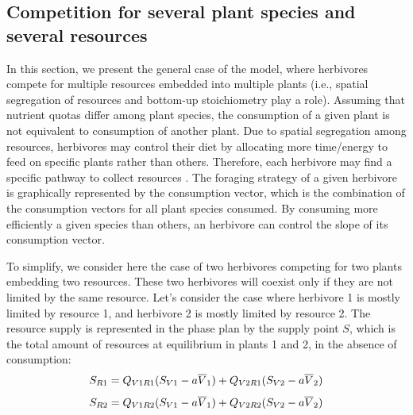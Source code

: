 \documentclass[12pt]{article}
\newcommand\barre[1]{\overline{\rule{0pt}{1.5ex}#1}}
\begin{document}



\subsection*{Competition for several plant species and several resources}

In this section, we present the general case of the model, where herbivores compete for multiple resources embedded into multiple plants (i.e., spatial segregation of resources and bottom-up stoichiometry play a role). Assuming that nutrient quotas differ among plant species, the consumption of a given plant is not equivalent to consumption of another plant. Due to spatial segregation among resources, herbivores may control their diet by allocating more time/energy to feed on specific plants rather than others. Therefore, each herbivore may find a specific pathway to collect resources \citep{Simpson1995, Raubenheimer1999}. The foraging strategy of a given herbivore is graphically represented by the consumption vector, which is the combination of the consumption vectors for all plant species consumed. %
By consuming more efficiently a given species than others, an herbivore can control the slope of its consumption vector. 
\par
To simplify, we consider here the case of two herbivores competing for two plants embedding two resources. %
These two herbivores will coexist only if they are not limited by the same resource. Let's consider the case where herbivore 1 is mostly limited by resource 1, and herbivore 2 is mostly limited by resource 2. The resource supply is represented in the phase plan by the supply point $S$, which is the total amount of resources at equilibrium in plants 1 and 2, in the absence of consumption:
\begin{equation}
S_{R1}=Q_{V1R1}(S_{V1}-a\barre{V}_1)+Q_{V2R1}(S_{V2}-a\barre{V}_2)
\end{equation}
\begin{equation}
S_{R2}=Q_{V1R2}(S_{V1}-a\barre{V}_1)+Q_{V2R2}(S_{V2}-a\barre{V}_2)
\end{equation}
\end{document}
